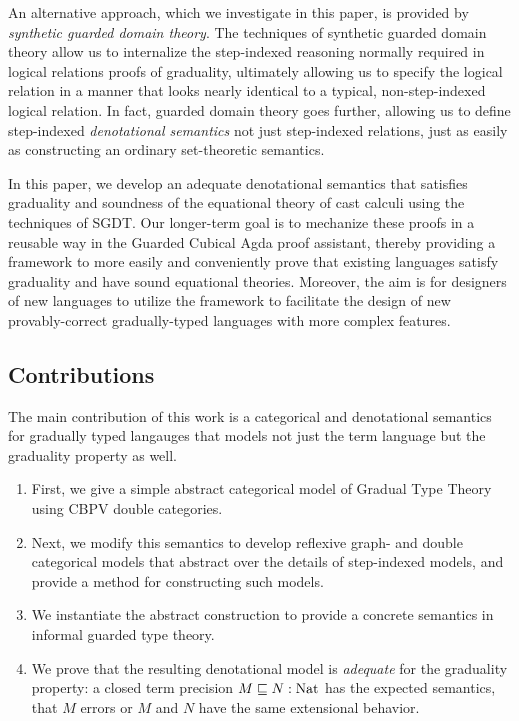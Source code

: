 An alternative approach, which we
investigate in this paper, is provided by \emph{synthetic guarded
domain theory}\cite{birkedal-mogelberg-schwinghammer-stovring2011}.
The techniques of synthetic guarded domain theory allow us to
internalize the step-indexed reasoning normally required in logical
relations proofs of graduality, ultimately allowing us to specify the
logical relation in a manner that looks nearly identical to a typical,
non-step-indexed logical relation. In fact, guarded domain theory goes
further, allowing us to define step-indexed \emph{denotational
semantics} not just step-indexed relations, just as easily as
constructing an ordinary set-theoretic semantics.

In this paper, we develop an adequate denotational semantics that
satisfies graduality and soundness of the equational theory of cast
calculi using the techniques of SGDT.  Our longer-term goal is to
mechanize these proofs in a reusable way in the Guarded Cubical Agda
proof assistant, thereby providing a framework to more easily
and conveniently prove that existing languages satisfy graduality and
have sound equational theories. Moreover, the aim is for designers of
new languages to utilize the framework to facilitate the design of new
provably-correct gradually-typed languages with more complex features.

\subsection{Contributions}

The main contribution of this work is a categorical and denotational
semantics for gradually typed langauges that models not just the term
language but the graduality property as well.
\begin{enumerate}
\item First, we give a simple abstract categorical model of Gradual Type Theory using CBPV double categories.
\item Next, we modify this semantics to develop reflexive graph- and
  double categorical models that abstract over the details of
  step-indexed models, and provide a method for constructing such models.
\item We instantiate the abstract construction to provide a concrete
  semantics in informal guarded type theory.
\item We prove that the resulting denotational model is
  \emph{adequate} for the graduality property: a closed term precision
  $M \sqsubseteq N : \text{Nat}$ has the expected semantics, that $M$ errors or
  $M$ and $N$ have the same extensional behavior.
\end{enumerate}

